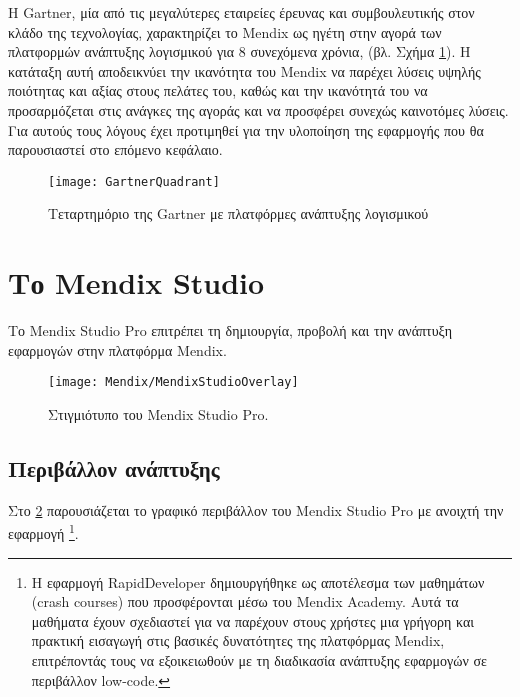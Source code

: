         Η Gartner, μία από τις μεγαλύτερες εταιρείες έρευνας και συμβουλευτικής στον κλάδο της τεχνολογίας, χαρακτηρίζει το Mendix ως ηγέτη στην αγορά των πλατφορμών ανάπτυξης λογισμικού για 8 συνεχόμενα χρόνια, (βλ. Σχήμα \ref{fig:GartnerQuadrant}). Η κατάταξη αυτή αποδεικνύει την ικανότητα του Mendix να παρέχει λύσεις υψηλής ποιότητας και αξίας στους πελάτες του, καθώς και την ικανότητά του να προσαρμόζεται στις ανάγκες της αγοράς και να προσφέρει συνεχώς καινοτόμες λύσεις. \cite{mendixGartnerQuadrant} Για αυτούς τους λόγους έχει προτιμηθεί για την υλοποίηση της εφαρμογής που θα παρουσιαστεί στο επόμενο κεφάλαιο.

            \begin{figure}[h!] \noindent \centering
                    \texttt{[image: GartnerQuadrant]}
                    \caption{\centering Τεταρτημόριο της Gartner με πλατφόρμες ανάπτυξης λογισμικού \cite{mendixGartnerQuadrant}}
                    \label{fig:GartnerQuadrant}
            \end{figure}

    \section{Το Mendix Studio}
        Το Mendix Studio Pro επιτρέπει τη δημιουργία, προβολή και την ανάπτυξη εφαρμογών στην πλατφόρμα Mendix.

        \begin{figure}[h!] \noindent \centering
                \texttt{[image: Mendix/MendixStudioOverlay]}
                \caption{\centering Στιγμιότυπο του Mendix Studio Pro.}
                \label{fig:MendixStudioOverlay}
        \end{figure}

        \subsection{Περιβάλλον ανάπτυξης}
        Στο \ref{fig:MendixStudioOverlay} παρουσιάζεται το γραφικό περιβάλλον του Mendix Studio Pro με ανοιχτή την εφαρμογή \footnote{Η εφαρμογή RapidDeveloper δημιουργήθηκε ως αποτέλεσμα των μαθημάτων (crash courses) που προσφέρονται μέσω του Mendix Academy. Αυτά τα μαθήματα έχουν σχεδιαστεί για να παρέχουν στους χρήστες μια γρήγορη και πρακτική εισαγωγή στις βασικές δυνατότητες της πλατφόρμας Mendix, επιτρέποντάς τους να εξοικειωθούν με τη διαδικασία ανάπτυξης εφαρμογών σε περιβάλλον low-code.}.

